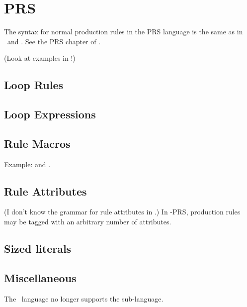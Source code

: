 
\section{PRS}
\label{sec:prs}

The syntax for normal production rules in the PRS language 
is the same as in \CAST\ and \hac.
See the PRS chapter of .

(Look at examples in !)

\subsection{Loop Rules}
\label{sec:prs:looprules}

\subsection{Loop Expressions}
\label{sec:prs:loopexpr}

\subsection{Rule Macros}
\label{sec:prs:macros}

Example:  and .

\subsection{Rule Attributes}
\label{sec:prs:ruleattrib}

(I don't know the grammar for rule attributes in \CAST.)
In \hac-PRS, production rules may be tagged with an
arbitrary number of attributes.  


\subsection{Sized literals}
\label{sec:prs:size}

\subsection{Miscellaneous}
\label{sec:prs:misc}

The \hac\ language no longer supports the  sub-language.  

